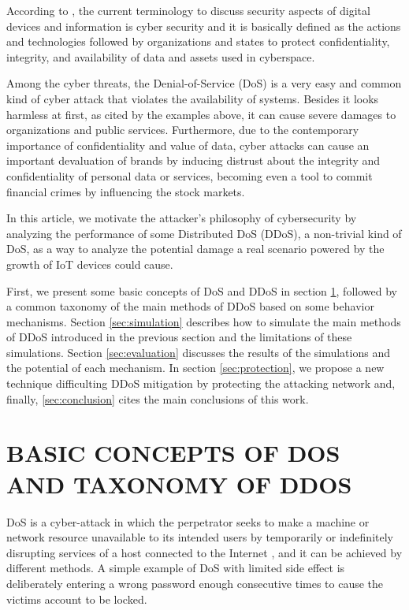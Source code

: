 \documentclass[a4paper,twoside]{article}
\begin{document}
According to \cite{Schatz:2017}, the current terminology to discuss security aspects of digital devices and information is cyber security and it is basically defined as the actions and technologies followed by organizations and states to protect confidentiality, integrity, and availability of data and assets used in cyberspace.

Among the cyber threats, the Denial-of-Service (DoS) is a very easy and common kind of cyber attack that violates the availability of systems. Besides it looks harmless at first, as cited by the examples above, it can cause severe damages to organizations and public services. Furthermore, due to the contemporary importance of confidentiality and value of data, cyber attacks can cause an important devaluation of brands by inducing distrust about the integrity and confidentiality of personal data or services, becoming even a tool to commit financial crimes by influencing the stock markets.

In this article, we motivate the attacker's philosophy of cybersecurity by analyzing the performance of some Distributed DoS (DDoS), a non-trivial kind of DoS, as a way to analyze the potential damage a real scenario powered by the growth of IoT devices could cause.

First, we present some basic concepts of DoS and DDoS in section \ref{sec:basic}, followed by a common taxonomy of the main methods of DDoS based on some behavior mechanisms. Section \ref{sec:simulation} describes how to simulate the main methods of DDoS introduced in the previous section and the limitations of these simulations. Section \ref{sec:evaluation} discusses the results of the simulations and the potential of each mechanism. In section \ref{sec:protection}, we propose a new technique difficulting DDoS mitigation by protecting the attacking network and, finally, \ref{sec:conclusion} cites the main conclusions of this work.

\section{\uppercase{Basic concepts of DoS and taxonomy of DDoS}} \label{sec:basic}

DoS is a cyber-attack in which the perpetrator seeks to make a machine or network resource unavailable to its intended users by temporarily or indefinitely disrupting services of a host connected to the Internet \cite{Soltanian:2016}, and it can be achieved by different methods. A simple example of DoS with limited side effect is deliberately entering a wrong password enough consecutive times to cause the victims account to be locked.
\end{document}
